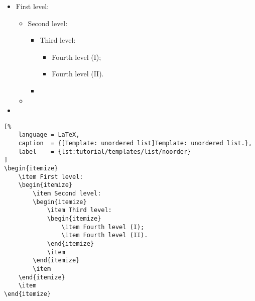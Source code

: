 
\begin{itemize}
    \item First level:
    \begin{itemize}
        \item Second level:
        \begin{itemize}
            \item Third level:
            \begin{itemize}
                \item Fourth level (I);
                \item Fourth level (II).
            \end{itemize}
            \item 
        \end{itemize}
        \item
    \end{itemize}
    \item
\end{itemize}

\begin{lstlisting}[%
    language = LaTeX,
    caption  = {[Template: unordered list]Template: unordered list.},
    label    = {lst:tutorial/templates/list/noorder}
]
\begin{itemize}
    \item First level:
    \begin{itemize}
        \item Second level:
        \begin{itemize}
            \item Third level:
            \begin{itemize}
                \item Fourth level (I);
                \item Fourth level (II).
            \end{itemize}
            \item 
        \end{itemize}
        \item
    \end{itemize}
    \item
\end{itemize}
\end{lstlisting}


